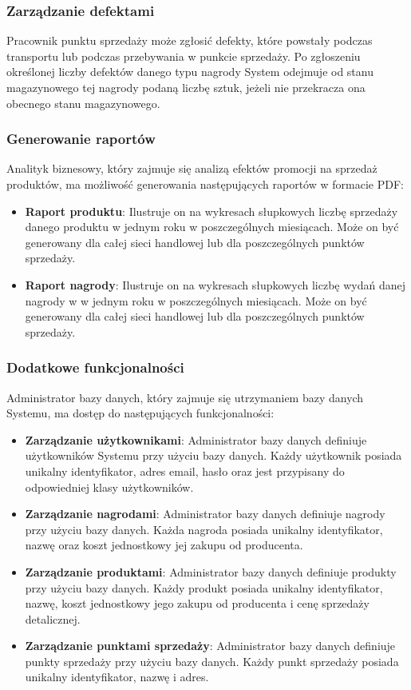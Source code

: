 \documentclass[a4paper,12pt]{article}
\begin{document}
\subsubsection{Zarządzanie defektami}

Pracownik punktu sprzedaży może zgłosić defekty, które powstały podczas transportu lub podczas przebywania w punkcie sprzedaży.
Po zgłoszeniu określonej liczby defektów danego typu nagrody System odejmuje od stanu magazynowego tej nagrody podaną liczbę sztuk, jeżeli nie przekracza ona obecnego stanu magazynowego.

\subsubsection{Generowanie raportów}

Analityk biznesowy, który zajmuje się analizą efektów promocji na sprzedaż produktów, ma możliwość generowania następujących raportów w formacie PDF:
\begin{itemize}
    \item \textbf{Raport produktu}:
    Ilustruje on na wykresach słupkowych liczbę sprzedaży danego produktu w jednym roku w poszczególnych miesiącach.
    Może on być generowany dla całej sieci handlowej lub dla poszczególnych punktów sprzedaży.
    \item \textbf{Raport nagrody}:
    Ilustruje on na wykresach słupkowych liczbę wydań danej nagrody w w jednym roku w poszczególnych miesiącach.
    Może on być generowany dla całej sieci handlowej lub dla poszczególnych punktów sprzedaży.
\end{itemize}

\subsubsection{Dodatkowe funkcjonalności}

Administrator bazy danych, który zajmuje się utrzymaniem bazy danych Systemu, ma dostęp do następujących funkcjonalności:
\begin{itemize}
    \item \textbf{Zarządzanie użytkownikami}:
    Administrator bazy danych definiuje użytkowników Systemu przy użyciu bazy danych.
    Każdy użytkownik posiada unikalny identyfikator, adres email, hasło oraz jest przypisany do odpowiedniej klasy użytkowników.
    \item \textbf{Zarządzanie nagrodami}:
    Administrator bazy danych definiuje nagrody przy użyciu bazy danych.
    Każda nagroda posiada unikalny identyfikator, nazwę oraz koszt jednostkowy jej zakupu od producenta.
    \item \textbf{Zarządzanie produktami}:
    Administrator bazy danych definiuje produkty przy użyciu bazy danych.
    Każdy produkt posiada unikalny identyfikator, nazwę, koszt jednostkowy jego zakupu od producenta i cenę sprzedaży detalicznej.
    \item \textbf{Zarządzanie punktami sprzedaży}:
    Administrator bazy danych definiuje punkty sprzedaży przy użyciu bazy danych.
    Każdy punkt sprzedaży posiada unikalny identyfikator, nazwę i adres.
\end{itemize}
\end{document}
